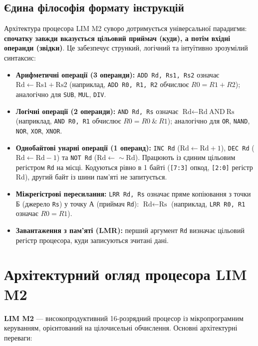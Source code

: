 \documentclass[11pt,a4paper]{article}
\newcommand{\reg}[1]{\texttt{#1}}
\begin{document}
\subsection{Єдина філософія формату інструкцій}
Архітектура процесора LIM M2 суворо дотримується універсальної парадигми: \textbf{спочатку завжди вказується цільовий приймач (куди), а потім вхідні операнди (звідки)}. Це забезпечує стрункий, логічний та інтуїтивно зрозумілий синтаксис:
\begin{itemize}
  \item \textbf{Арифметичні операції (3 операнди):} \texttt{ADD Rd, Rs1, Rs2} означає $\text{Rd} \leftarrow \text{Rs1} + \text{Rs2}$ (наприклад, \texttt{ADD R0, R1, R2} обчислює $R0 = R1 + R2$); аналогічно для \texttt{SUB}, \texttt{MUL}, \texttt{DIV}.
  \item \textbf{Логічні операції (2 операнди):} \texttt{AND Rd, Rs} означає $\text{Rd} \leftarrow \text{Rd} \ \text{AND}\ \text{Rs}$ (наприклад, \texttt{AND R0, R1} обчислює $R0 = R0 \ \& \ R1$); аналогічно для \texttt{OR}, \texttt{NAND}, \texttt{NOR}, \texttt{XOR}, \texttt{XNOR}.
  \item \textbf{Однобайтові унарні операції (1 операнд):} \texttt{INC Rd} ($\text{Rd} \leftarrow \text{Rd} + 1$), \texttt{DEC Rd} ($\text{Rd} \leftarrow \text{Rd} - 1$) та \texttt{NOT Rd} ($\text{Rd} \leftarrow \sim\text{Rd}$). Працюють із єдиним цільовим регістром \reg{Rd} на місці. Кодуються рівно в 1 байті (\texttt{[7:3]} опкод, \texttt{[2:0]} регістр Rd), другий байт із шини пам'яті не запитується.
  \item \textbf{Міжрегістрові пересилання:} \texttt{LRR Rd, Rs} означає пряме копіювання з точки Б (джерело \reg{Rs}) у точку А (приймач \reg{Rd}): $\text{Rd} \leftarrow \text{Rs}$ (наприклад, \texttt{LRR R0, R1} означає $R0 = R1$).
  \item \textbf{Завантаження з пам'яті (LMR):} перший аргумент \reg{Rd} визначає цільовий регістр процесора, куди записуються зчитані дані.
\end{itemize}

\section{Архітектурний огляд процесора LIM M2}
\textbf{LIM M2} --- високопродуктивний 16-розрядний процесор із мікропрограмним керуванням, орієнтований на цілочисельні обчислення. Основні архітектурні переваги:
\end{document}
